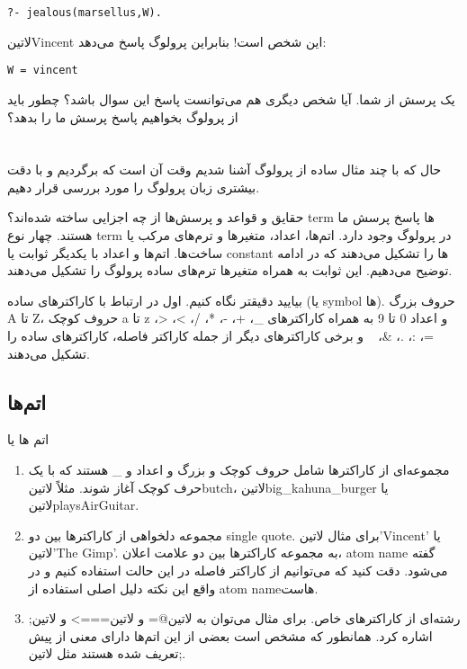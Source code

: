 \begin{latin}
\begin{lstlisting}
?- jealous(marsellus,W).
\end{lstlisting}
\end{latin}

‌لاتین{Vincent} این شخص است! بنابراین پرولوگ پاسخ می‌دهد:

\begin{latin}
\begin{lstlisting}
W = vincent
\end{lstlisting}
\end{latin}

یک پرسش از شما. آیا شخص دیگری هم می‌توانست پاسخ این سوال باشد؟ چطور باید از پرولوگ بخواهیم پاسخ پرسش ما را بدهد؟

\section{}
حال که با چند مثال ساده از پرولوگ آشنا شدیم وقت آن است که برگردیم و با دقت بیشتری زبان پرولوگ را مورد بررسی قرار دهیم.

حقایق و قواعد و پرسش‌ها از چه اجزایی ساخته شده‌اند؟ term ها پاسخ پرسش ما هستند. چهار نوع term در پرولوگ وجود دارد. اتم‌ها، اعداد، متغیرها و ترم‌های مرکب یا ساخت‌ها. اتم‌ها و اعداد با یکدیگر ثوابت یا constant ها را تشکیل می‌دهند که در ادامه توضیح می‌دهیم. این ثوابت به همراه متغیرها ترم‌های ساده پرولوگ را تشکیل می‌دهند.

بیایید دقیقتر نگاه کنیم. اول در ارتباط با کاراکترهای ساده (یا symbol ها). حروف بزرگ A تا Z، حروف کوچک a تا z و اعداد 0 تا 9 به همراه کاراکترهای \_، +، -، *، /، >، <، =، :، .، \&، ~ و برخی کاراکترهای دیگر از جمله کاراکتر فاصله، کاراکترهای ساده را تشکیل می‌دهند.

\subsection{اتم‌ها}

اتم ها یا
\begin{enumerate}
\item
مجموعه‌ای از کاراکترها شامل حروف کوچک و بزرگ و اعداد و \_ هستند که با یک حرف کوچک آغاز شوند. مثلاً  ‌لاتین{butch}، ‌لاتین{big\_kahuna\_burger} یا ‌لاتین{playsAirGuitar}.
\item
مجموعه دلخواهی از کاراکترها بین دو single quote. برای مثال ‌لاتین{'Vincent'} یا ‌لاتین{'The  Gimp'}. به مجموعه کاراکترها بین دو علامت اعلان، atom name گفته می‌شود. دقت کنید که می‌توانیم از کاراکتر فاصله در این حالت استفاده کنیم و در واقع این نکته دلیل اصلی استفاده از atom name‌هاست.
\item 
رشته‌ای از کاراکترهای خاص. برای مثال می‌توان به ‌لاتین{@=} و ‌لاتین{===>} و ‌لاتین{;} اشاره کرد. همانطور که مشخص است بعضی از این اتم‌ها دارای معنی از پیش تعریف شده هستند مثل ‌لاتین{;}.
\end{enumerate}

